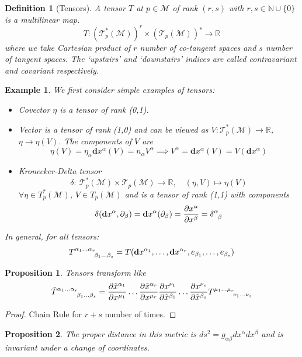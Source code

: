\documentclass[a4paper]{article}
\newtheorem{eg}{Example}[section]
\theoremstyle{new}
\newtheorem{defi}{Definition}[section]
\newtheorem{prop}{Proposition}[section]
\begin{document}
\begin{defi}[Tensors]
A tensor $T$ at $p\in\mathcal{M}$ of rank $(r,s)$ with $r,s\in\mathbb{N}\cup\{0\}$ is a multilinear map.
$$T:(\mathcal{T}_p^*(\mathcal{M}))^r\times(\mathcal{T}_p(\mathcal{M}))^s\rightarrow\mathbb{R}$$
where we take Cartesian product of $r$ number of co-tangent spaces and $s$ number of tangent spaces. The `upstairs' and `downstairs' indices are called contravariant and covariant respectively.
\end{defi}
\begin{eg}
We first consider simple examples of tensors:
\begin{itemize}
    \item Covector $\eta$ is a tensor of rank (0,1). 
    \item Vector is a tensor of rank (1,0) and can be viewed as $V:\mathcal{T}_p^*(\mathcal{M})\rightarrow\mathbb{R}$, $\eta\rightarrow\eta(V)$. The components of $V$ are
    $$\eta(V)=\eta_\alpha\mathbf{d}x^\alpha(V)=n_\alpha V^\alpha\implies V^\alpha=\mathbf{d}x^\alpha(V)=V(\mathbf{d}x^\alpha)$$
    \item Kronecker-Delta tensor
    $$\delta:~\mathcal{T}_p^*(\mathcal{M})\times \mathcal{T}_p(\mathcal{M})\rightarrow\mathbb{R},\quad(\eta,V)\mapsto\eta(V)$$
    $\forall\eta\in T_p^*(\mathcal{M})$, $V\in T_p(\mathcal{M})$ and is a tensor of rank (1,1) with components $$\delta(\mathbf{d}x^\alpha,\partial_\beta)=\mathbf{d}x^\alpha(\partial_\beta)=\frac{\partial x^\alpha}{\partial x^\beta}=\tensor*{\delta}{*_{}^{\alpha}_{\beta}}$$
\end{itemize}
In general, for all tensors:
$$\tensor*{T}{*_{}^{\alpha_1\dots \alpha_r}_{\beta_1\dots \beta_s}}=T(\mathbf{d}x^{\alpha_1},\dots ,\mathbf{d}x^{\alpha_r},e_{\beta_1},\dots ,e_{\beta_s})$$
\end{eg}
\begin{prop}
Tensors transform like
$$\tensor*{\tilde{T}}{*_{}^{\alpha_1\dots \alpha_r}_{\beta_1\dots \beta_s}}=\frac{\partial\tilde{x}^{\alpha_1}}{\partial x^{\mu_1}}\dots \frac{\partial\tilde{x}^{\alpha_r}}{\partial x^{\mu_r}}\frac{\partial x^{\nu_1}}{\partial\tilde{x}^{\beta_1}}\dots \frac{\partial x^{\nu_s}}{\partial\tilde{x}^{\beta_s}}\tensor*{T}{*_{}^{\mu_1\dots \mu_r}_{\nu_1\dots \nu_s}}$$
\end{prop}
\begin{proof}
Chain Rule for $r+s$ number of times.
\end{proof}
\begin{prop}
The proper distance in this metric is $ds^2=g_{\alpha\beta}dx^\alpha dx^\beta$ and is invariant under a change of coordinates.
\end{prop}
\end{document}
